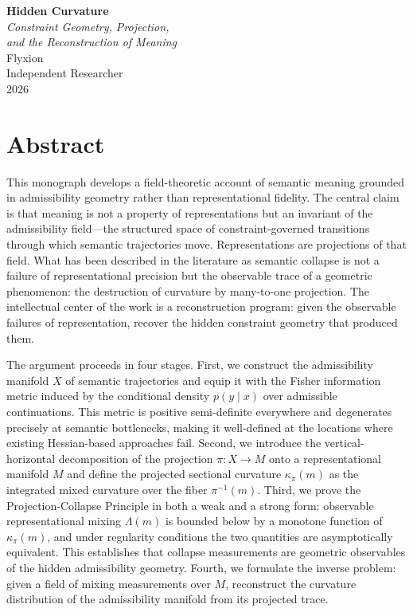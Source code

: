 \documentclass[12pt, oneside]{book}
\theoremstyle{plain-flyxion}
\theoremstyle{definition-flyxion}
\newcommand{\kpi}{\kappa_{\pi}}
\newcommand{\Lam}{\Lambda}
\begin{document}
\frontmatter

\begin{titlepage}
\centering
\vspace*{2.5cm}
{\Large\bfseries Hidden Curvature}\\[1.2em]
{\large\itshape Constraint Geometry, Projection,\\[0.3em]
and the Reconstruction of Meaning}\\[3.5cm]
{\large Flyxion}\\[0.8em]
{\normalsize Independent Researcher}\\[3.5cm]
{\normalsize 2026}
\vfill
\end{titlepage}

\chapter*{Abstract}

This monograph develops a field-theoretic account of semantic meaning grounded in
admissibility geometry rather than representational fidelity. The central claim is that
meaning is not a property of representations but an invariant of the admissibility
field---the structured space of constraint-governed transitions through which semantic
trajectories move. Representations are projections of that field. What has been described
in the literature as semantic collapse is not a failure of representational precision but
the observable trace of a geometric phenomenon: the destruction of curvature by
many-to-one projection. The intellectual center of the work is a reconstruction program:
given the observable failures of representation, recover the hidden constraint geometry
that produced them.

The argument proceeds in four stages. First, we construct the admissibility manifold $X$
of semantic trajectories and equip it with the Fisher information metric induced by the
conditional density $p(y\mid x)$ over admissible continuations. This metric is positive
semi-definite everywhere and degenerates precisely at semantic bottlenecks, making it
well-defined at the locations where existing Hessian-based approaches fail. Second, we
introduce the vertical-horizontal decomposition of the projection $\pi:X\to M$ onto a
representational manifold $M$ and define the projected sectional curvature $\kpi(m)$ as
the integrated mixed curvature over the fiber $\pi^{-1}(m)$. Third, we prove the
Projection-Collapse Principle in both a weak and a strong form: observable representational
mixing $\Lam(m)$ is bounded below by a monotone function of $\kpi(m)$, and under
regularity conditions the two quantities are asymptotically equivalent. This establishes
that collapse measurements are geometric observables of the hidden admissibility geometry.
Fourth, we formulate the inverse problem: given a field of mixing measurements over $M$,
reconstruct the curvature distribution of the admissibility manifold from its projected
trace.
\end{document}
